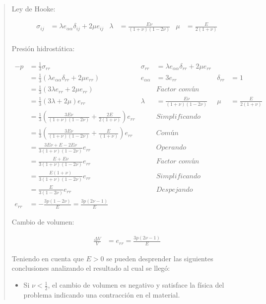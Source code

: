 \documentclass[a4paper,10pt,twoside,final,spanish]{article}
\begin{document}
\begin{quote}

Ley de Hooke:

\begin{align*}
\sigma_{ij} &= \lambda e_{\alpha\alpha}\delta_{ij}+2\mu e_{ij}
& \lambda &= \frac{E\nu}{(1+\nu)(1-2\nu)}
& \mu     &= \frac{E}{2(1+\nu)} \\
\end{align*}

Presión hidrostática:

\begin{align*}
-p &= \frac{1}{3}\sigma_{rr}
& \sigma_{rr} &= \lambda e_{\alpha\alpha}\delta_{rr}+2\mu e_{rr} \\
&= \frac{1}{3}(\lambda e_{\alpha\alpha}\delta_{rr}+2\mu e_{rr}) 
& e_{\alpha\alpha} &= 3e_{rr} & \delta_{rr} &= 1 \\
&= \frac{1}{3}(3\lambda e_{rr}+2\mu e_{rr}) && \textit{Factor común} \\
&= \frac{1}{3}(3\lambda+2\mu)e_{rr} 
& \lambda &= \frac{E\nu}{(1+\nu)(1-2\nu)}
& \mu     &= \frac{E}{2(1+\nu)} \\
&= \frac{1}{3}\left(\frac{3E\nu}{(1+\nu)(1-2\nu)}+\frac{2E}{2(1+\nu)}\right)e_{rr}
&& \textit{Simplificando} \\
&= \frac{1}{3}\left(\frac{3E\nu}{(1+\nu)(1-2\nu)}+\frac{E}{(1+\nu)}\right)e_{rr}
&& \textit{Común denominador} \\
&= \frac{3E\nu+E-2E\nu}{3(1+\nu)(1-2\nu)}e_{rr} && \textit{Operando} \\
&= \frac{E+E\nu}{3(1+\nu)(1-2\nu)}e_{rr} && \textit{Factor común} \\
&= \frac{E(1+\nu)}{3(1+\nu)(1-2\nu)}e_{rr} && \textit{Simplificando} \\
&= \frac{E}{3(1-2\nu)}e_{rr} && \textit{Despejando} \\
e_{rr} &= -\frac{3p(1-2\nu)}{E}=\frac{3p(2\nu-1)}{E}
\end{align*}

Cambio de volumen:

\begin{align*}
\frac{\Delta V}{V} &= e_{rr}=\frac{3p(2\nu-1)}{E}
\end{align*}

Teniendo en cuenta que $E>0$ se pueden desprender las siguientes conclusiones analizando el resultado al cual se llegó:

\begin{itemize}
\item Si $\nu<\frac{1}{2}$, el cambio de volumen es negativo y satisface la física del problema indicando una contracción en el material.


\end{itemize}
\end{quote}
\end{document}
